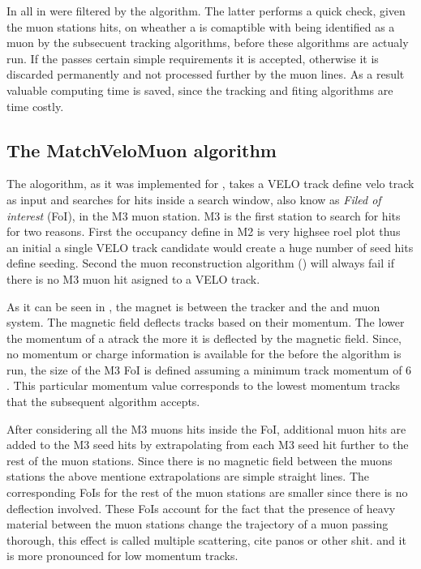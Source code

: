 In \runone all \veloTracks in \hltone were filtered by the \mvm algorithm. The latter performs a quick check,
given the muon stations hits, on wheather a \veloTrack is comaptible with being identified as a muon by the subsecuent
tracking algorithms, before these algorithms are actualy run. If the \veloTrack passes certain simple requirements it
is accepted, otherwise it is discarded permanently and not processed further by the \hlt muon lines. As a result
valuable computing time is saved, since the \FwD tracking and fiting algorithms are time costly.

\subsection{The MatchVeloMuon algorithm}
\label{sec:muon_matching}

The \mvm alogorithm, as it was implemented for \runone \cite{roelThesis}, takes a VELO track{\color{red} define velo track} as input
and searches for hits inside a search window, also know as {\it Filed of interest} (FoI), in the M3 muon station.
M3 is the first station to search for hits for two reasons. First the occupancy{\color{red} define} in M2 is very high{\color{red}see roel plot}
thus an initial a single VELO track candidate would create
a huge number of seed hits{\color{red} define seeding}. Second the muon reconstruction algorithm (\isMuon) will always fail if
there is no M3 muon hit asigned to a VELO track.

As it can be seen in \figref{}, the \lhcb magnet is between the \velo tracker and the and muon system.
The \lhcb magnetic field deflects tracks based on their momentum. The lower the momentum of a atrack the more
it is deflected by the magnetic field. Since, no momentum or charge information is available for the \veloTrack
before the \FwD algorithm is run, the size of the M3 FoI is defined assuming a minimum track momentum of 6 \gevc.
This particular momentum value corresponds to the lowest momentum tracks that the subsequent \isMuon algorithm accepts.

After considering all the M3 muons hits inside the FoI, additional muon hits are added to
the M3 seed hits by extrapolating from each M3 seed hit further to the rest of the muon stations.
Since there is no magnetic field between the muons stations the above mentione extrapolations are simple straight lines.
The corresponding FoIs for the rest of the muon stations are smaller since there is no deflection involved.
These FoIs account for the fact that the presence of heavy material between the muon stations change the
trajectory of a muon passing thorough, this effect is called multiple scattering, {\color{red} cite panos or other shit.}
and it is more pronounced for low momentum tracks.

